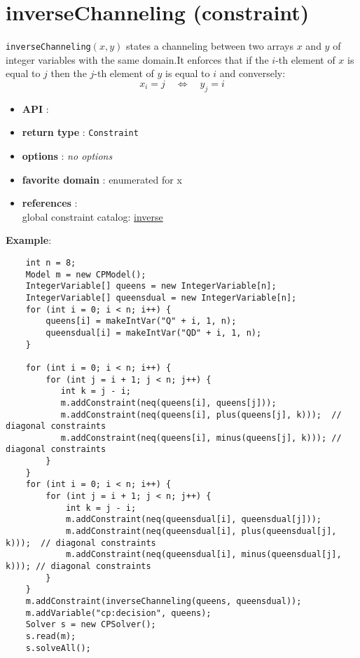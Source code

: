 \label{inversechanneling}
\hypertarget{inversechanneling}{}

\section{inverseChanneling (constraint)}\label{inversechanneling:inversechannelingconstraint}\hypertarget{inversechanneling:inversechannelingconstraint}{}
\begin{notedef}
  \texttt{inverseChanneling}$(x,y)$ states a channeling between two arrays  $x$ and $y$ of integer variables with the same domain.It enforces that if the $i$-th element of $x$ is equal to $j$ then the $j$-th element of $y$ is equal to $i$ and conversely:
$$x_i = j\quad\iff\quad y_j = i$$
\end{notedef}
\begin{itemize}
	\item \textbf{API} : 
	\item \textbf{return type} : \texttt{Constraint}
	\item \textbf{options} : \emph{no options}
	\item \textbf{favorite domain} : enumerated for x
	\item \textbf{references} :\\
      global constraint catalog: \href{http://www.emn.fr/x-info/sdemasse/gccat/Cinverse.html}{inverse}
\end{itemize}

\textbf{Example}:
\begin{lstlisting}
	int n = 8;
	Model m = new CPModel();
	IntegerVariable[] queens = new IntegerVariable[n];
	IntegerVariable[] queensdual = new IntegerVariable[n];
	for (int i = 0; i < n; i++) {
	    queens[i] = makeIntVar("Q" + i, 1, n);
	    queensdual[i] = makeIntVar("QD" + i, 1, n);
	}
	
	for (int i = 0; i < n; i++) {
	    for (int j = i + 1; j < n; j++) {
	       int k = j - i;
	       m.addConstraint(neq(queens[i], queens[j]));
	       m.addConstraint(neq(queens[i], plus(queens[j], k)));  // diagonal constraints
	       m.addConstraint(neq(queens[i], minus(queens[j], k))); // diagonal constraints
	    }
	}
	for (int i = 0; i < n; i++) {
	    for (int j = i + 1; j < n; j++) {
	        int k = j - i;
	        m.addConstraint(neq(queensdual[i], queensdual[j]));
	        m.addConstraint(neq(queensdual[i], plus(queensdual[j], k)));  // diagonal constraints
	        m.addConstraint(neq(queensdual[i], minus(queensdual[j], k))); // diagonal constraints
	    }
	}
	m.addConstraint(inverseChanneling(queens, queensdual));
	m.addVariable("cp:decision", queens);
	Solver s = new CPSolver();
	s.read(m);
	s.solveAll();
\end{lstlisting}
